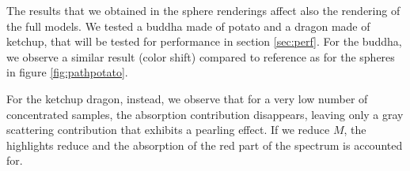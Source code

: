 The results that we obtained in the sphere renderings affect also the rendering of the full models. We tested a buddha made of potato and a dragon made of ketchup, that will be tested for performance in section \ref{sec:perf}. For the buddha, we observe a similar result (color shift) compared to reference as for the spheres in figure \ref{fig:pathpotato}.

For the ketchup dragon, instead, we observe that for a very low number of concentrated samples, the absorption contribution disappears, leaving only a gray scattering contribution that exhibits a pearling effect. If we reduce $M$, the highlights reduce and the absorption of the red part of the spectrum is accounted for.


\begin{figure}
\centering
{}
\end{figure}
